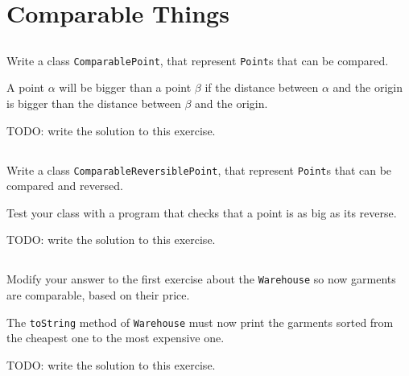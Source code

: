 \documentclass[a4paper, 11pt]{article}
\begin{document}

\section{Comparable Things}

\subsection{}

Write a class \texttt{ComparablePoint}, that represent \texttt{Point}s that can
be compared.

A point $\alpha$ will be bigger than a point $\beta$ if the distance between
$\alpha$ and the origin is bigger than the distance between $\beta$ and the
origin.

\begin{solution}
TODO: write the solution to this exercise.
\end{solution}


\subsection{}

Write a class \texttt{ComparableReversiblePoint}, that represent
\texttt{Point}s that can be compared and reversed.

Test your class with a program that checks that a point is as big as its reverse.

\begin{solution}
TODO: write the solution to this exercise.
\end{solution}


\subsection{}

Modify your answer to the first exercise about the \texttt{Warehouse} so now
garments are comparable, based on their price.

The \texttt{toString} method of \texttt{Warehouse} must now print the garments
sorted from the cheapest one to the most expensive one.

\begin{solution}
TODO: write the solution to this exercise.
\end{solution}
\end{document}
